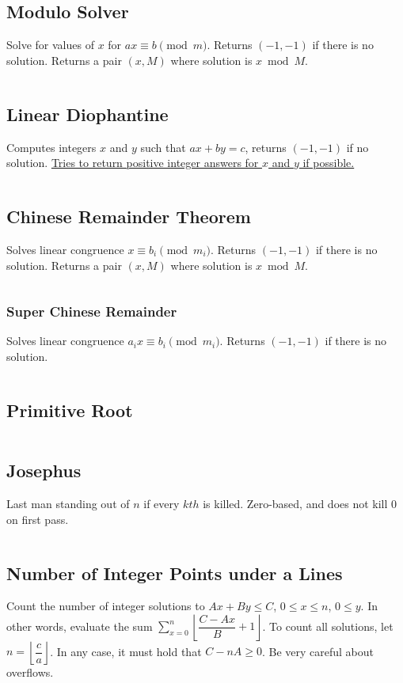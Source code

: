 \documentclass[8pt,a4paper,landscape,oneside]{amsart}
\newcommand{\code}[1]{\inputminted[fontsize=\normalsize,baselinestretch=1]{cpp}{_code/#1}}
\begin{document}
\begin{multicols*}{3}
  \subsection{Modulo Solver}
    Solve for values of $x$ for $ax \equiv b \pmod m$. Returns $(-1,-1)$ if there is no solution. Returns a pair $(x, M)$ where solution is $x \bmod M$.
    \code{numtheory/modsolver.cpp}
  \subsection{Linear Diophantine}
    Computes integers $x$ and $y$ such that $ax+by=c$, returns $(-1,-1)$ if no solution. \underline{Tries to return positive integer answers for $x$ and $y$ if possible.}
    \code{numtheory/linear-diophantine.cpp}
  \subsection{Chinese Remainder Theorem}
    Solves linear congruence $x \equiv b_i \pmod {m_i}$. Returns $(-1,-1)$ if there is no solution. Returns a pair $(x, M)$ where solution is $x \bmod M$.
    \code{numtheory/chinese-remainder.cpp}
    \subsubsection{Super Chinese Remainder}
      Solves linear congruence $a_i x \equiv b_i \pmod {m_i}$. Returns $(-1,-1)$ if there is no solution.
      \code{numtheory/super-crt.cpp}
  \subsection{Primitive Root}
    \code{numtheory/primitive_root.cpp}
  \subsection{Josephus}
    Last man standing out of $n$ if every $kth$ is killed. Zero-based, and does not kill $0$ on first pass.
    \code{numtheory/josephus.cpp}
  \subsection{Number of Integer Points under a Lines}
    Count the number of integer solutions to $Ax+By \leq C$, $0 \leq x \leq n$,
    $0 \leq y$. In other words, evaluate the sum $\sum_{x=0}^n\left\lfloor\dfrac{C-Ax}{B}+1\right\rfloor$.
    To count all solutions, let $n = \left\lfloor\dfrac{c}{a}\right\rfloor$.
    In any case, it must hold that $C-nA \geq 0$. Be very careful about overflows.

\end{multicols*}
\end{document}
